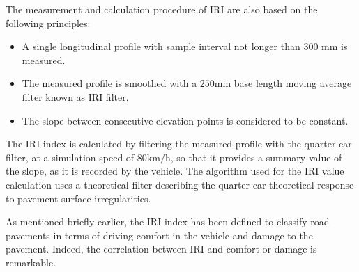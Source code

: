 \documentclass[tesi]{subfiles}
\begin{document}
\clearpage The measurement and calculation procedure of IRI are also based on the following principles:
\begin{itemize}

\item A single longitudinal profile with sample interval not longer than $300$ $\si{\milli\meter}$ is measured.
\item The measured profile is smoothed with a $250$\si{\milli\meter} base length moving average filter known as IRI filter.
\item The slope between consecutive elevation points is considered to be constant.

\end{itemize}
The IRI index is calculated by filtering the measured profile with the quarter car filter, at a simulation speed of $\num{80} \si{\km\per\hour}$, so that it provides a summary value of the slope, as it is recorded by the vehicle. The algorithm used for the IRI value calculation uses a theoretical filter describing the quarter car theoretical response to pavement surface irregularities.

As mentioned briefly earlier, the IRI index has been defined to classify road pavements in terms of driving comfort in the vehicle and damage to the pavement. Indeed, the correlation between IRI and comfort or damage is remarkable\cite{gillespie1992everything}.
\end{document}
